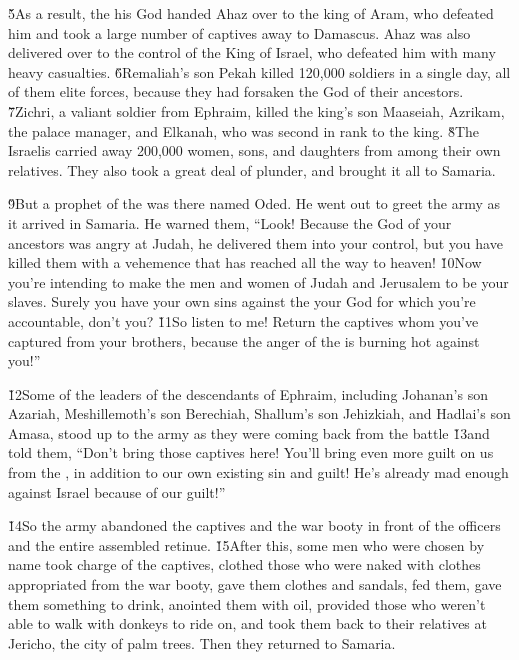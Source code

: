 \v{5}As a result, the  his God handed Ahaz over to the king of Aram, who defeated him and took a large number of captives away to Damascus. Ahaz was also delivered over to the control of the King of Israel, who defeated him with many heavy casualties. \v{6}Remaliah's son Pekah killed 120,000 soldiers in a single day, all of them elite forces, because they had forsaken the  God of their ancestors. \v{7}Zichri, a valiant soldier from Ephraim, killed the king's son Maaseiah, Azrikam, the palace manager, and Elkanah, who was second in rank to the king. \v{8}The Israelis carried away 200,000 women, sons, and daughters from among their own relatives. They also took a great deal of plunder, and brought it all to Samaria.

\v{9}But a prophet of the  was there named Oded. He went out to greet the army as it arrived in Samaria. He warned them, ``Look! Because the  God of your ancestors was angry at Judah, he delivered them into your control, but you have killed them with a vehemence that has reached all the way to heaven! \v{10}Now you're intending to make the men and women of Judah and Jerusalem to be your slaves. Surely you have your own sins against the  your God for which you're accountable, don't you? \v{11}So listen to me! Return the captives whom you've captured from your brothers, because the anger of the  is burning hot against you!''

\v{12}Some of the leaders of the descendants of Ephraim, including Johanan's son Azariah, Meshillemoth's son Berechiah, Shallum's son Jehizkiah, and Hadlai's son Amasa, stood up to the army as they were coming back from the battle \v{13}and told them, ``Don't bring those captives here! You'll bring even more guilt on us from the , in addition to our own existing sin and guilt! He's already mad enough against Israel because of our guilt!''

\v{14}So the army abandoned the captives and the war booty in front of the officers and the entire assembled retinue. \v{15}After this, some men who were chosen by name took charge of the captives, clothed those who were naked with clothes appropriated from the war booty, gave them clothes and sandals, fed them, gave them something to drink, anointed them with oil, provided those who weren't able to walk with donkeys to ride on, and took them back to their relatives at Jericho, the city of palm trees. Then they returned to Samaria.

